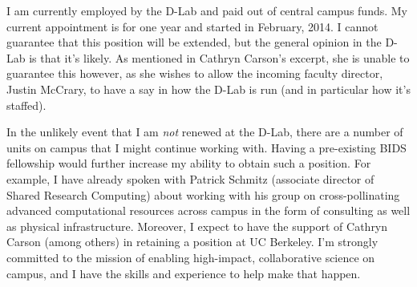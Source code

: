 





I am currently employed by the D-Lab and paid out of central campus funds. My
current appointment is for one year and started in February, 2014. I cannot
guarantee that this position will be extended, but the general opinion in the
D-Lab is that it's likely. As mentioned in Cathryn Carson's excerpt, she is
unable to guarantee this however, as she wishes to allow the incoming faculty
director, Justin McCrary, to have a say in how the D-Lab is run (and in
particular how it's staffed).

In the unlikely event that I am \emph{not} renewed at the D-Lab, there are a
number of units on campus that I might continue working with. Having a
pre-existing BIDS fellowship would further increase my ability to obtain such a
position. For example, I have already spoken with Patrick Schmitz (associate
director of Shared Research Computing) about working with his group on
cross-pollinating advanced computational resources across campus in the form of
consulting as well as physical infrastructure. Moreover, I expect to have the
support of Cathryn Carson (among others) in retaining a position at UC Berkeley.
I'm strongly committed to the mission of enabling high-impact, collaborative
science on campus, and I have the skills and experience to help make that
happen.


